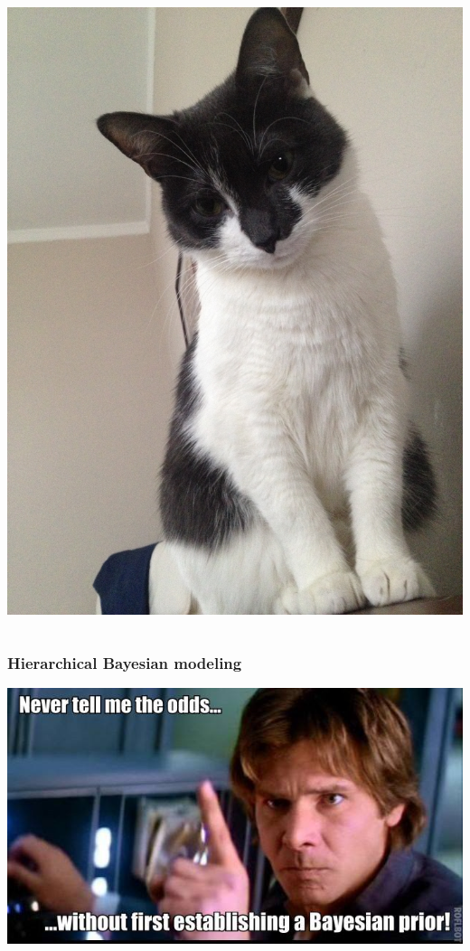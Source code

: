 \documentclass{beamer}
\begin{document}
\begin{frame}
\begin{columns}
\begin{column}{0.5\textwidth}
\begin{center}
        \includegraphics[height = 0.5\textheight, keepaspectratio = true]{figure/annyong}
      \end{center}
    \end{column}
  \end{columns}
\end{frame}

\begin{frame}
  \frametitle{Hierarchical Bayesian modeling}

  \includegraphics[width = \textwidth,height = 0.8\textheight,keepaspectratio = true]{figure/han_bayes}

  \tiny{}
\end{frame}
\end{document}
